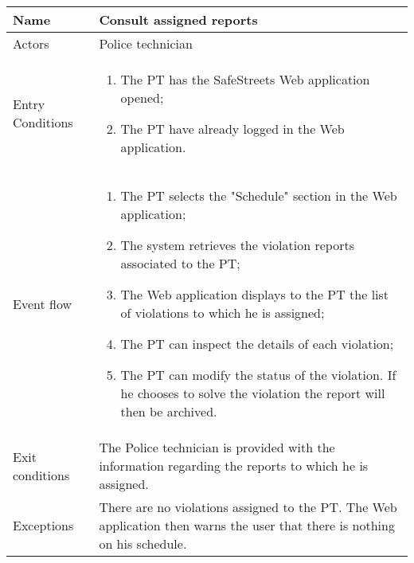 \begin{table}[H]
  \centering
  \begin{tabularx}{\textwidth}{ |l|X| }
    \hline
    Name & Consult assigned reports \\
    \hline
    Actors & Police technician\\
    \hline
    Entry Conditions & \begin{enumerate}[noitemsep]
                        \item The PT has the SafeStreets Web application opened;
                        \item The PT have already logged in the Web application.
                      \end{enumerate}\\
    \hline
    Event flow & \begin{enumerate}[noitemsep]
                    \item The PT selects the "Schedule" section in the Web application;
                    \item The system retrieves the violation reports associated to the PT;
                    \item The Web application displays to the PT the list of violations to which he is assigned;
                    \item The PT can inspect the details of each violation;
                    \item The PT can modify the status of the violation. If he chooses to solve the violation the report will then be archived.           
                \end{enumerate}\\
    \hline
    Exit conditions & The Police technician is provided with the information regarding the reports to which he is assigned.\\ 
    \hline
    Exceptions &  There are no violations assigned to the PT. The Web application then warns the user that there is nothing on his schedule. \\
    \hline
  \end{tabularx}
\end{table}
